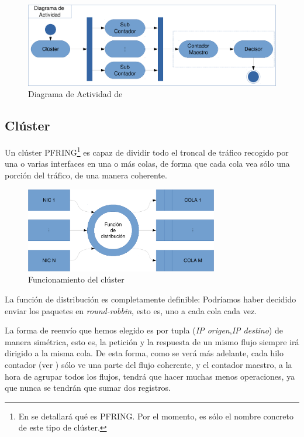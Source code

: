 \begin{figure}[htbp]
\centering
\includegraphics[width=\textwidth]{CapituloEstructura/Figuras/DiagramaFlow-crop}
\caption{Diagrama de Actividad de \redborderddos}
\end{figure}
%

\subsection{Clúster}
Un clúster \acrshort{PFRING}\footnote{En  se detallará qué es \acrshort{PFRING}. Por el 
momento, es sólo el nombre concreto de este tipo de clúster.} es capaz de dividir todo el troncal de tráfico recogido 
por una o varias interfaces en una o más colas, de forma que cada cola vea sólo una porción del tráfico, de una manera 
coherente.

\begin{figure}[htbp]
\centering
\includegraphics[width=0.75\textwidth]{CapituloEstructura/Figuras/Cluster-crop}
\caption{Funcionamiento del clúster}
\end{figure}
%

La función de distribución es completamente definible: Podríamos haber decidido enviar los paquetes en 
\emph{round-robbin}, esto es, uno a cada cola cada vez.

La forma de reenvío que hemos elegido es por tupla (\emph{IP origen},\emph{IP destino}) de manera simétrica, esto es, 
la petición y la respuesta de un mismo flujo siempre irá dirigido a la misma cola. De esta forma, como se verá más 
adelante, cada hilo contador (ver ) sólo ve una parte del flujo coherente, y el contador maestro, a 
la hora de agrupar todos los flujos, tendrá que hacer muchas menos operaciones, ya que nunca se tendrán que sumar dos 
registros.

